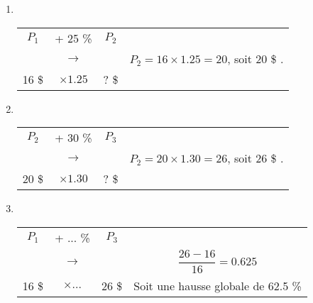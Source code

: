 \documentclass[xcolor={dvipsnames}]{beamer}
\begin{document}
\begin{frame}{}

\begin{enumerate}[1)]
\item \

\setlength{\tabcolsep}{4pt}
\begin{table}[h!]
	\centering
	\begin{tabular}{|ccc|c|}
		\hline
		$P_1$ & + \num{25} \%  & $P_2$ &\\
		& {\LARGE $\rightarrow$} &	&	$P_2 = \num{16} \times \num{1.25} = 20$, soit 20 \$ .	\\
		\num{16} \$ & $\times \num{1.25}$ & ? \$ & \\
		\hline
	\end{tabular}
	
\end{table}

\pause

\item \ 

\begin{table}[h!]
	\centering
	\begin{tabular}{|ccc|c|}
		\hline
		$P_2$ & + \num{30} \%  & $P_3$ &\\
		& {\LARGE$\rightarrow$} &	&	$P_2 = \num{20} \times \num{1.30} = 26$, soit 26 \$ .	\\
		\num{20} \$ & $\times \num{1.30}$ & ? \$ & \\
		\hline
	\end{tabular}
	
\end{table} \pause


\item \ 
\begin{table}[h!]
	\centering
	\begin{tabular}{|ccc|c|}
		\hline
		$P_1$ & + ... \%  & $P_3$ & \\
		& {\LARGE$\rightarrow$} &	&	 $\dfrac{\num{26} - \num{16}}{\num{16}} = \num{0.625}$	\\
		\num{16} \$ & $\times ...$ & 26 \$ & Soit une hausse globale de \num{62.5} \% \\
		\hline
	\end{tabular}
	
\end{table}


\end{enumerate}

\end{frame}
\end{document}
